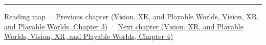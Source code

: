 \begin{center}\rule{0.5\linewidth}{0.5pt}\end{center}

\hyperref[volume-reading-map]{Reading map} · \href{../07-Vision-XR-and-Playable-Worlds/main.pdf\#nameddest=04-visual-computing-ii-ch032-pose-estimation-and-robust-fitting}{Previous chapter (Vision, XR, and Playable Worlds, Vision, XR, and Playable Worlds, Chapter 3)} · \href{../07-Vision-XR-and-Playable-Worlds/main.pdf\#nameddest=04-visual-computing-ii-ch034-learned-3d-shapes-and-scene-representations}{Next chapter (Vision, XR, and Playable Worlds, Vision, XR, and Playable Worlds, Chapter 4)}
